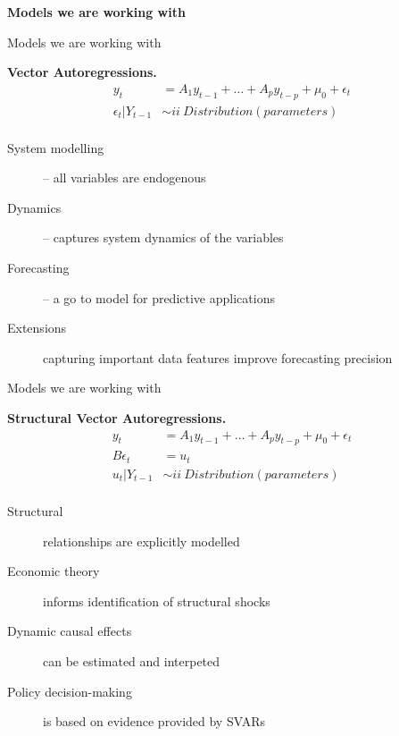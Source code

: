 \documentclass[notes,blackandwhite,mathsans]{beamer}
\begin{document}
{
\begin{frame}

\begin{adjustwidth}{-0.5cm}{0cm}
\vspace{8.3cm}\Large
\textbf{{\color{mcxs3}Models } {\color{mcxs1}we are working with}}
\end{adjustwidth}

\end{frame}
}




\begin{frame}{Models we are working with}

\textbf{Vector Autoregressions.}
\begin{align*}
y_t &= A_1 y_{t-1} + \dots + A_p y_{t-p}  + \mu_0 + \epsilon_t\\[1ex]
\epsilon_t|Y_{t-1} &\sim ii \ Distribution(parameters)\\
\end{align*}

\begin{description}
\item[System modelling] {\color{mcxs2}-- all variables are endogenous} 
\item[Dynamics] {\color{mcxs2}-- captures system dynamics of the variables} 
\item[Forecasting] {\color{mcxs2}-- a go to model for predictive applications} 
\item[Extensions] {\color{mcxs2} capturing important data features improve forecasting precision}
\end{description}
\end{frame}




\begin{frame}{Models we are working with}

\textbf{Structural Vector Autoregressions.}
\begin{align*}
y_t &= A_1 y_{t-1} + \dots + A_p y_{t-p}  + \mu_0 + \epsilon_t\\[1ex]
B\epsilon_t &= u_t \\[1ex]
u_t|Y_{t-1} &\sim ii \ Distribution(parameters)\\
\end{align*}

\begin{description}
\item[Structural] {\color{mcxs2}relationships are explicitly modelled} 
\item[Economic theory] {\color{mcxs2}informs identification of structural shocks} 
\item[Dynamic causal effects] {\color{mcxs2}can be estimated and interpeted} 
\item[Policy decision-making] {\color{mcxs2}is based on evidence provided by SVARs}
\end{description}
\end{frame}
\end{document}
